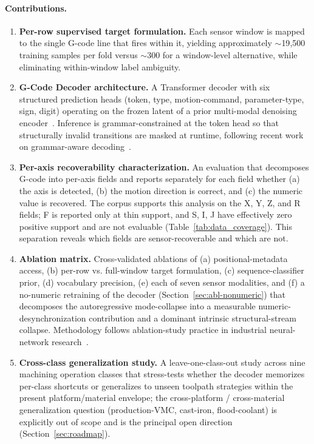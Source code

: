 \documentclass[sensors,article,submit,moreauthors,pdftex]{Definitions/mdpi}
\newcommand{\modelname}{G-Code Decoder}
\begin{document}
\paragraph{Contributions.}
\begin{enumerate}[label=\textbf{(\arabic*)}, leftmargin=*]
\item \textbf{Per-row supervised target formulation.} Each sensor window is mapped to the single G-code line that fires within it, yielding approximately $\sim$19{,}500 training samples per fold versus $\sim$300 for a window-level alternative, while eliminating within-window label ambiguity.

\item \textbf{\modelname{} architecture.} A Transformer decoder with six structured prediction heads (token, type, motion-command, parameter-type, sign, digit) operating on the frozen latent of a prior multi-modal denoising encoder~\cite{encoder_paper}. Inference is grammar-constrained at the token head so that structurally invalid transitions are masked at runtime, following recent work on grammar-aware decoding~\cite{picard,outlines,xgrammar}.

\item \textbf{Per-axis recoverability characterization.} An evaluation that decomposes G-code into per-axis fields and reports separately for each field whether (a) the axis is detected, (b) the motion direction is correct, and (c) the numeric value is recovered. The corpus supports this analysis on the X, Y, Z, and R fields; F is reported only at thin support, and S, I, J have effectively zero positive support and are not evaluable (Table~\ref{tab:data_coverage}). This separation reveals which fields are sensor-recoverable and which are not.

\item \textbf{Ablation matrix.} Cross-validated ablations of (a) positional-metadata access, (b) per-row vs. full-window target formulation, (c) sequence-classifier prior, (d) vocabulary precision, (e) each of seven sensor modalities, and (f) a no-numeric retraining of the decoder (Section~\ref{sec:abl-nonumeric}) that decomposes the autoregressive mode-collapse into a measurable numeric-desynchronization contribution and a dominant intrinsic structural-stream collapse. Methodology follows ablation-study practice in industrial neural-network research~\cite{meyes2019ablation,jia2016deep}.

\item \textbf{Cross-class generalization study.} A leave-one-class-out study across nine machining operation classes that stress-tests whether the decoder memorizes per-class shortcuts or generalizes to unseen toolpath strategies within the present platform/material envelope; the cross-platform / cross-material generalization question (production-VMC, cast-iron, flood-coolant) is explicitly out of scope and is the principal open direction (Section~\ref{sec:roadmap}).


\end{enumerate}
\end{document}
